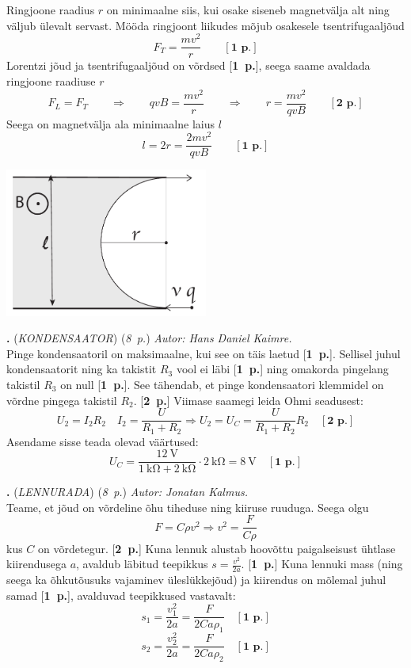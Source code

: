 \documentclass[12pt,a5paper]{article}
\newcommand{\numb}[1]{\vspace{5pt}\textbf{\large #1}}
\newcommand{\nimi}[1]{(\textsl{\small #1})}
\newcommand{\punktid}[1]{(\emph{#1~p.})}
\newcounter{ylesanne}
\newcommand{\yl}[1]{\addtocounter{ylesanne}{1}\numb{\theylesanne.} \nimi{#1} \newblock{}}
\newcommand{\pp}[1]{[\textbf{#1~p.}]}
\newcommand{\autor}[1]{\emph{ Autor: #1.\\}}
\begin{document}
Ringjoone raadius $r$ on minimaalne siis, kui osake siseneb magnetvälja alt ning väljub ülevalt servast. Mööda ringjoont liikudes mõjub osakesele tsentrifugaaljõud
\[ F_T = \frac{mv^2}{r} \quad\quad\pp{1} \]
Lorentzi jõud ja tsentrifugaaljõud on võrdsed \pp{1}, seega saame avaldada ringjoone raadiuse $r$
\[ F_L = F_T \quad\quad\Rightarrow\quad\quad qvB = \frac{mv^2}{r} \quad\quad\Rightarrow\quad\quad r = \frac{mv^2}{qvB} \quad\quad\pp{2}\]
Seega on magnetvälja ala minimaalne laius $l$
\[ l = 2r = \frac{2mv^2}{qvB} \quad\quad\pp{1} \]

 \vspace{-20pt}
  \begin{center}
    \includegraphics[width=0.5\textwidth]{osakelah}
  \end{center}
  \vspace{-20pt}

\yl{KONDENSAATOR} \punktid{8} \autor{Hans Daniel Kaimre}
Pinge kondensaatoril on  maksimaalne, kui see on täis laetud \pp{1}. Sellisel juhul kondensaatorit ning ka takistit $R_3$ vool ei läbi \pp{1} ning omakorda pingelang takistil $R_3$ on null \pp{1}. See tähendab, et pinge kondensaatori klemmidel on võrdne pingega takistil $R_2$. \pp{2} Viimase saamegi leida Ohmi seadusest:
$$U_2=I_2R_2 \quad I_2=\frac{U}{R_1+R_2} \Rightarrow U_2=U_C=\frac{U}{R_1+R_2}R_2\quad\pp{2}$$
Asendame sisse teada olevad väärtused:
$$U_C=\frac{\SI{12}{\V}}{\SI{1}{\kilo\ohm}+\SI{2}{\kilo\ohm}}\cdot\SI{2}{\kilo\ohm}=\SI{8}{\V}\quad\pp{1}$$

\yl{LENNURADA} \punktid{8} \autor{Jonatan Kalmus}
Teame, et jõud on võrdeline õhu tiheduse ning kiiruse ruuduga. Seega olgu 
$$F=C\rho v^2 \Rightarrow v^2=\frac{F}{C\rho}$$
kus $C$ on võrdetegur. \pp{2} Kuna lennuk alustab hoovõttu paigalseisust ühtlase kiirendusega $a$, avaldub läbitud teepikkus $s=\frac{v^2}{2a}$. \pp{1} Kuna lennuki mass (ning seega ka õhkutõusuks vajaminev üleslükkejõud) ja kiirendus on mõlemal juhul samad \pp{1}, avalduvad teepikkused vastavalt:
$$s_1=\frac{v_1^2}{2a}=\frac{F}{2Ca\rho_1}\quad\pp{1}$$ 
$$s_2=\frac{v_2^2}{2a}=\frac{F}{2Ca\rho_2}\quad\pp{1}$$   
\end{document}
